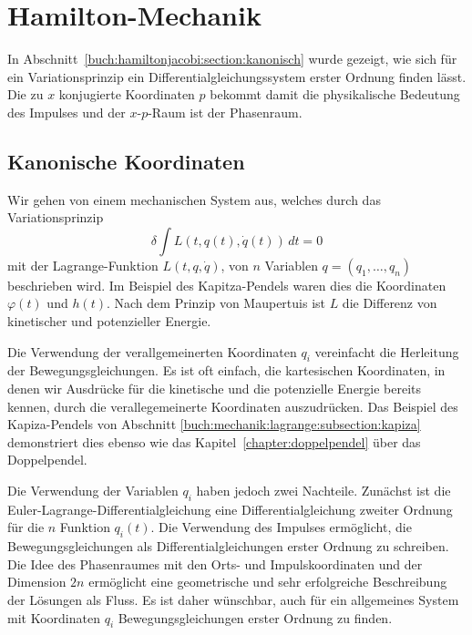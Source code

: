 %
%
%
\section{Hamilton-Mechanik
\label{buch:mechanik:section:hamilton}}
In Abschnitt~\ref{buch:hamiltonjacobi:section:kanonisch} wurde gezeigt,
wie sich für ein Variationsprinzip ein Differentialgleichungssystem
erster Ordnung finden lässt.
Die zu $x$ konjugierte Koordinaten $p$ bekommt damit die physikalische
Bedeutung des Impulses und der $x$-$p$-Raum ist der Phasenraum.

%
%
\subsection{Kanonische Koordinaten}
Wir gehen von einem mechanischen System aus, welches durch das
Variationsprinzip 
\begin{equation}
\delta
\int
L(t, q(t), \dot{q}(t))\,dt
=
0
\label{buch:mechanik:hamilton:eqn:variation}
\end{equation}
mit der Lagrange-Funktion $L(t,q,\dot{q})$, von $n$ Variablen
$q=(q_1,\dots,q_n)$ beschrieben wird.
Im Beispiel des Kapitza-Pendels waren dies die Koordinaten $\varphi(t)$
und $h(t)$.
Nach dem Prinzip von Maupertuis ist $L$ die Differenz von kinetischer
und potenzieller Energie.

Die Verwendung der verallgemeinerten Koordinaten $q_i$ vereinfacht
die Herleitung der Bewegungsgleichungen.
Es ist oft einfach, die kartesischen Koordinaten, in denen wir Ausdrücke
für die kinetische und die potenzielle Energie bereits kennen, durch
die verallegemeinerte Koordinaten auszudrücken.
Das Beispiel des Kapiza-Pendels von
Abschnitt \ref{buch:mechanik:lagrange:subsection:kapiza}
demonstriert dies ebenso wie das Kapitel~\ref{chapter:doppelpendel}
über das Doppelpendel.

Die Verwendung der Variablen $q_i$ haben jedoch zwei Nachteile.
Zunächst ist die Euler-Lagrange-Differentialgleichung eine
Differentialgleichung zweiter Ordnung für die $n$ Funktion 
$q_i(t)$.
Die Verwendung des Impulses ermöglicht, die Bewegungsgleichungen
als Differentialgleichungen erster Ordnung zu schreiben.
Die Idee des Phasenraumes mit den Orts- und Impulskoordinaten
und der Dimension $2n$ ermöglicht eine geometrische und sehr erfolgreiche
Beschreibung der Lösungen als Fluss.
Es ist daher wünschbar, auch für ein allgemeines System mit Koordinaten
$q_i$ Bewegungsgleichungen erster Ordnung zu finden.

